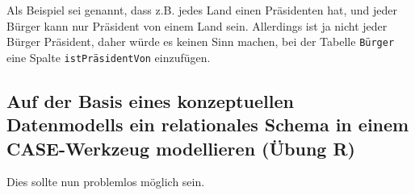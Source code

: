 Als Beispiel sei genannt, dass z.B. jedes Land einen Präsidenten hat, und jeder Bürger kann nur Präsident von einem Land sein. Allerdings ist ja nicht jeder Bürger Präsident, daher würde es keinen Sinn machen, bei der Tabelle \verb"Bürger" eine Spalte \verb"istPräsidentVon" einzufügen.

\subsection{Auf der Basis eines konzeptuellen Datenmodells ein relationales Schema in einem CASE-Werkzeug modellieren (Übung R)}

Dies sollte nun problemlos möglich sein.